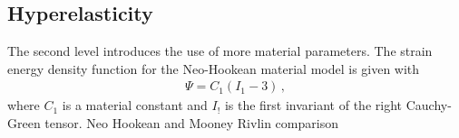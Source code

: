 \subsection{Hyperelasticity}
The second level introduces the use of more material parameters.
The strain energy density function for the Neo-Hookean material model is given with
\begin{align}
            \Psi = C_1 (I_1 - 3) \, ,
\end{align}
where $C_1$ is a material constant and $I_!$ is the first invariant of the right Cauchy-Green tensor. 
Neo Hookean and Mooney Rivlin comparison








%            

